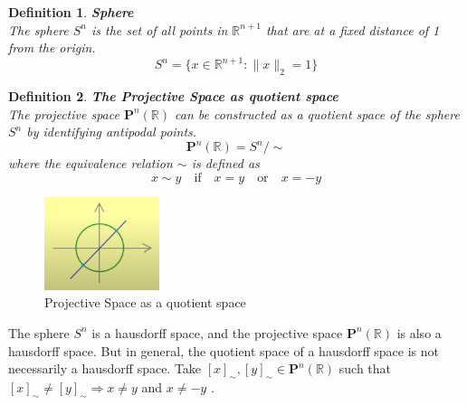 \documentclass[11pt]{book} %
\newtheorem{definition}{Definition}[section]
\begin{document}
\begin{definition}{\textbf{Sphere}} \\
    The sphere \( S^n \) is the set of all points in \( \mathbb{R}^{n+1} \) that are at a fixed distance of 1 from the origin.
    \begin{equation*}
        S^n = \{ x \in \mathbb{R}^{n+1} : \|x\|_2 = 1 \}
    \end{equation*}
\end{definition}

\begin{definition}{\textbf{The Projective Space as quotient space}} \\
    The projective space \( \mathbf{P}^n (\mathbb{R}) \) can be constructed as a quotient space of the sphere \( S^n \) by identifying antipodal points.
    \begin{equation*}
        \mathbf{P}^n (\mathbb{R}) = S^n / \sim
    \end{equation*}
    where the equivalence relation \( \sim \) is defined as
    \begin{equation*}
        x \sim y \quad \text{if} \quad x = y \quad \text{or} \quad x = -y
    \end{equation*}
\end{definition}

\begin{figure}[H]
    \centering
    \includegraphics[width=0.3\textwidth]{Figs/projective_space.png}
    \caption{Projective Space as a quotient space}
\end{figure}

The sphere \( S^n \) is a hausdorff space, and the projective space \( \mathbf{P}^n (\mathbb{R}) \) is also a hausdorff space.
But in general, the quotient space of a hausdorff space is not necessarily a hausdorff space.
Take \( [x]_\sim, [y]_\sim \in \mathbf{P}^n (\mathbb{R}) \) such that \( [x]_\sim \neq [y]_\sim \Rightarrow x \neq y \) and \( x \neq -y \) .
\end{document}
